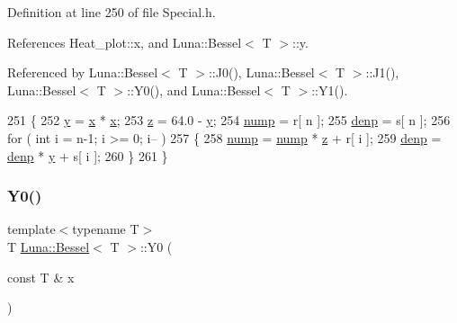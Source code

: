Definition at line 250 of file Special.\+h.



References Heat\+\_\+plot\+::x, and Luna\+::\+Bessel$<$ T $>$\+::y.



Referenced by Luna\+::\+Bessel$<$ T $>$\+::\+J0(), Luna\+::\+Bessel$<$ T $>$\+::\+J1(), Luna\+::\+Bessel$<$ T $>$\+::\+Y0(), and Luna\+::\+Bessel$<$ T $>$\+::\+Y1().


\begin{DoxyCode}
251       \{
252             \hyperlink{structLuna_1_1Bessel_ab054d5c26284b7736633c171cd2717fc}{y} = \hyperlink{namespaceHeat__plot_aa88370c16b85b784ccbde3ed88bc1991}{x} * \hyperlink{namespaceHeat__plot_aa88370c16b85b784ccbde3ed88bc1991}{x};
253             \hyperlink{structLuna_1_1Bessel_a3ffa857b03c181b3e3ba7422124c60e1}{z} = 64.0 - \hyperlink{structLuna_1_1Bessel_ab054d5c26284b7736633c171cd2717fc}{y};
254             \hyperlink{structLuna_1_1Bessel_a01ee09f3e4275f102df4c3b83fad1776}{nump} = r[ n ];
255             \hyperlink{structLuna_1_1Bessel_a71fa71babc245cef7c0902591ed30fff}{denp} = s[ n ];
256             \textcolor{keywordflow}{for} ( \textcolor{keywordtype}{int} i = n-1; i >= 0; i-- )
257         \{
258                 \hyperlink{structLuna_1_1Bessel_a01ee09f3e4275f102df4c3b83fad1776}{nump} = \hyperlink{structLuna_1_1Bessel_a01ee09f3e4275f102df4c3b83fad1776}{nump} * \hyperlink{structLuna_1_1Bessel_a3ffa857b03c181b3e3ba7422124c60e1}{z} + r[ i ];
259                 \hyperlink{structLuna_1_1Bessel_a71fa71babc245cef7c0902591ed30fff}{denp} = \hyperlink{structLuna_1_1Bessel_a71fa71babc245cef7c0902591ed30fff}{denp} * \hyperlink{structLuna_1_1Bessel_ab054d5c26284b7736633c171cd2717fc}{y} + s[ i ];
260             \}
261         \}
\end{DoxyCode}
\mbox{\label{structLuna_1_1Bessel_aaa4710f118acafa90f55c1a93b3748da}} 
\subsubsection{\texorpdfstring{Y0()}{Y0()}}
{\footnotesize\ttfamily template$<$typename T$>$ \\
T \hyperlink{structLuna_1_1Bessel}{Luna\+::\+Bessel}$<$ T $>$\+::Y0 (\begin{DoxyParamCaption}\item[{const T \&}]{x }\end{DoxyParamCaption})\hspace{0.3cm}{\ttfamily [inline]}}



